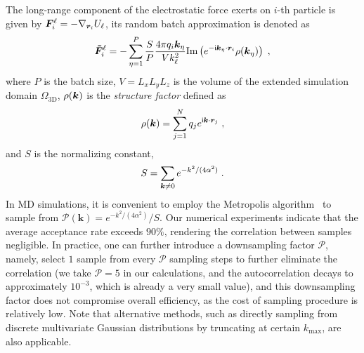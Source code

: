 The long-range component of the electrostatic force exerts on $i$-th particle is given by $\boldsymbol{F}_i^{\ell}=-\nabla_{\bm{r}_i}U_{\ell}$, its random batch approximation is denoted as
\begin{equation}\label{eq:forceRBE}
\begin{aligned}
    \boldsymbol{\tilde{F}}_i^{\ell}=-\sum_{\eta=1}^P \frac{S}{P}\frac{4\pi q_i\boldsymbol{k}_\eta}{Vk_\ell^2} \text{Im}\left(e^{-\mathsf i \boldsymbol{k}_\eta\cdot \boldsymbol{r}_i}\rho(\boldsymbol{k}_\eta)\right)\;,
\end{aligned}
\end{equation}
where $P$ is the batch size, $V=L_xL_yL_z$ is the volume of the extended simulation domain $\Omega_{\text{3D}}$, 
 {
$\rho(\boldsymbol{k})$ is the \textit{structure factor} defined as
\begin{equation}
    \rho(\boldsymbol{k})=\sum_{j=1}^N q_j e^{\mathsf i \boldsymbol{k}\cdot \boldsymbol{r}_j}\;,
\end{equation}
}
and $S$ is the normalizing constant,
\begin{equation}\label{eq:normalizingS}
\begin{aligned}
S=\sum_{\boldsymbol{k} \neq 0} e^{-k^2/(4\alpha^2)}\;.
\end{aligned}
\end{equation}
In MD simulations, it is convenient to employ the Metropolis algorithm~\cite{metropolis1953equation} to sample from $\mathscr{P}(\bm{k})=e^{-k^2/(4\alpha^2)}/S$. 
 {Our numerical experiments indicate that the average acceptance rate exceeds $90\%$, rendering the correlation between samples negligible. In practice, one can further introduce a downsampling factor $\mathcal{P}$, namely, select $1$ sample from every $\mathcal{P}$ sampling steps to further eliminate the correlation (we take $\mathcal{P}=5$ in our calculations, and the autocorrelation decays to approximately $10^{-3}$, which is already a very small value), and this downsampling factor does not compromise overall efficiency, as the cost of sampling procedure is relatively low. Note that alternative methods, such as directly sampling from discrete multivariate Gaussian distributions by truncating at certain $k_{\mathrm{max}}$, are also applicable.}


